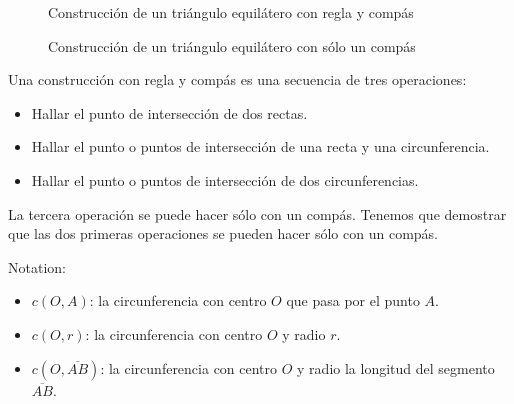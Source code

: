 \begin{figure}%
\begin{minipage}{.45\textwidth}
\begin{center}
\caption{Construcción de un triángulo equilátero con regla y compás}\label{f.compass-equi}
\end{center}
\end{minipage}
\hfill
\begin{minipage}{.45\textwidth}
\begin{center}
\caption{Construcción de un triángulo equilátero con sólo un compás}\label{f.compass-equi-only}
\end{center}
\end{minipage}
\end{figure}

Una construcción con regla y compás es una secuencia de tres operaciones:
\begin{itemize}
\item Hallar el punto de intersección de dos rectas.
\item Hallar el punto o puntos de intersección de una recta y una circunferencia.
\item Hallar el punto o puntos de intersección de dos circunferencias.
\end{itemize}
La tercera operación se puede hacer sólo con un compás. Tenemos que demostrar que las dos primeras operaciones se pueden hacer sólo con un compás.

\noindent{}Notation:
\begin{itemize}
\item $c(O,A)$: la circunferencia con centro $O$ que pasa por el punto $A$.
\item $c(O,r)$: la circunferencia con centro $O$ y radio $r$.
\item $c(O,\overline{AB})$: la circunferencia con centro $O$ y radio la longitud del segmento $\overline{AB}$.
\end{itemize}

